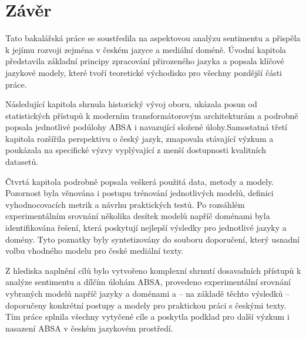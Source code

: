 \chapter*{Závěr}

Tato bakalářská práce se soustředila na aspektovou analýzu sentimentu a přispěla k jejímu rozvoji zejména v českém jazyce a mediální doméně. Úvodní kapitola představila základní principy zpracování přirozeného jazyka a popsala klíčové jazykové modely, které tvoří teoretické východisko pro všechny pozdější části práce.

Následující kapitola shrnula historický vývoj oboru, ukázala posun od statistických přístupů k moderním transformátorovým architekturám a podrobně popsala jednotlivé podúlohy ABSA i navazující složené úlohy.Samostatná třetí kapitola rozšířila perspektivu o český jazyk, zmapovala stávající výzkum a poukázala na specifické výzvy vyplývající z menší dostupnosti kvalitních datasetů.

Čtvrtá kapitola podrobně popsala veškerá použitá data, metody a modely. Pozornost byla věnována i postupu trénování jednotlivých modelů, definici vyhodnocovacích metrik a návrhu praktických testů. Po rozsáhlém experimentálním srovnání několika desítek modelů napříč doménami byla identifikována řešení, která poskytují nejlepší výsledky pro jednotlivé jazyky a domény. Tyto poznatky byly syntetizovány do souboru doporučení, který usnadní volbu vhodného modelu pro české mediální texty.

Z hlediska naplnění cílů bylo vytvořeno komplexní shrnutí dosavadních přístupů k analýze sentimentu a dílčím úlohám ABSA, provedeno experimentální srovnání vybraných modelů napříč jazyky a doménami a -- na základě těchto výsledků -- doporučeny konkrétní postupy a modely pro praktickou práci s českými texty. Tím práce splnila všechny vytyčené cíle a poskytla podklad pro další výzkum i nasazení ABSA v českém jazykovém prostředí.